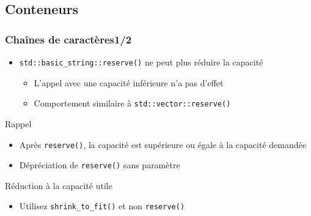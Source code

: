 \documentclass[C++.tex]{subfiles}
\begin{document}
\subsection*{Conteneurs}
\begin{frame}[fragile]
	\frametitle{Chaînes de caractères\titlehfill{}1/2}
	\begin{itemize}
		\item \lstinline|std::basic_string::reserve()| ne peut plus réduire la capacité
		\begin{itemize}
			\item L'appel avec une capacité inférieure n'a pas d'effet


			\item Comportement similaire à \lstinline|std::vector::reserve()|
		\end{itemize}
	\end{itemize}

	\begin{block}{Rappel}
		\begin{itemize}
			\item Après \lstinline|reserve()|, la capacité est supérieure ou égale à la capacité demandée
		\end{itemize}
	\end{block}

	\begin{itemize}
		\item Dépréciation de \lstinline|reserve()| sans paramètre
	\end{itemize}


	\begin{exampleblock}{Réduction à la capacité utile}
		\begin{itemize}
			\item Utilisez \lstinline|shrink_to_fit()| et non \lstinline|reserve()|
		\end{itemize}

	\end{exampleblock}
\end{frame}
\end{document}
